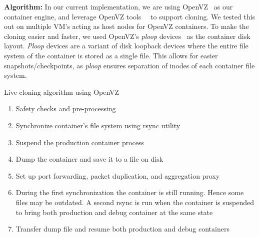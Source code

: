 


\noindent
\textbf{Algorithm:} 
In our current implementation, we are using OpenVZ~\cite{openvz} as our container engine, and leverage OpenVZ tools~\cite{vzctl}~\cite{mirkin2008containers} to support cloning.
We tested this out on multiple VM's acting as host nodes for OpenVZ containers. 
To make the cloning easier and faster, we used OpenVZ's \textit{ploop} devices~\cite{ploop} as the container disk layout. 
\textit{Ploop} devices are a variant of disk loopback devices where the entire file system of the container is stored as a single file. 
This allows for easier snapshots/checkpoints, as \textit{ploop} ensures separation of inodes of each container file system.

\begin{algorithm}[ht!]
  \caption{Live cloning algorithm using OpenVZ} 
  \label{algCloning}
  \begin{enumerate}[topsep=0pt,itemsep=-1ex,partopsep=1ex,parsep=1ex]
  \item Safety checks and pre-processing 
  \item Synchronize container's file system using rsync utility  
  \item Suspend the production container process
  \item Dump the container and save it to a file on disk
  \item Set up port forwarding, packet duplication, and aggregation proxy
  \item During the first synchronization the container is still running. 
Hence some files may be outdated. 
A second rsync is run when the container is suspended to bring both production and debug container at the same state
  \item Transfer dump file and resume both production and debug containers
  \end{enumerate}
\end{algorithm}

